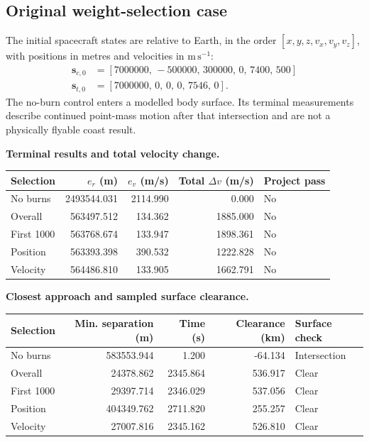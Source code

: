 \subsection{Original weight-selection case}
The initial spacecraft states are relative to Earth, in the order
$[x,y,z,v_x,v_y,v_z]$, with positions in metres and velocities in
$\mathrm{m\,s^{-1}}$:
\begin{align*}
\mathbf s_{c,0}&=[7000000,\,-500000,\,300000,\,0,\,7400,\,500]\\
\mathbf s_{t,0}&=[7000000,\,0,\,0,\,0,\,7546,\,0].
\end{align*}
The no-burn control enters a modelled body surface. Its terminal
measurements describe continued point-mass motion after that
intersection and are not a physically flyable coast result.
\par\noindent\textbf{Terminal results and total velocity change.}
\begin{center}
\begin{tabular}{lrrrl}
\toprule
Selection & $e_r$ (m) & $e_v$ (m/s) & Total $\Delta v$ (m/s) & Project pass\\
\midrule
No burns & 2493544.031 & 2114.990 & 0.000 & No\\
Overall & 563497.512 & 134.362 & 1885.000 & No\\
First 1000 & 563768.674 & 133.947 & 1898.361 & No\\
Position & 563393.398 & 390.532 & 1222.828 & No\\
Velocity & 564486.810 & 133.905 & 1662.791 & No\\
\bottomrule
\end{tabular}
\end{center}
\par\noindent\textbf{Closest approach and sampled surface clearance.}
\begin{center}
\begin{tabular}{lrrrl}
\toprule
Selection & Min. separation (m) & Time (s) & Clearance (km) & Surface check\\
\midrule
No burns & 583553.944 & 1.200 & -64.134 & Intersection\\
Overall & 24378.862 & 2345.864 & 536.917 & Clear\\
First 1000 & 29397.714 & 2346.029 & 537.056 & Clear\\
Position & 404349.762 & 2711.820 & 255.257 & Clear\\
Velocity & 27007.816 & 2345.162 & 526.810 & Clear\\
\bottomrule
\end{tabular}
\end{center}
